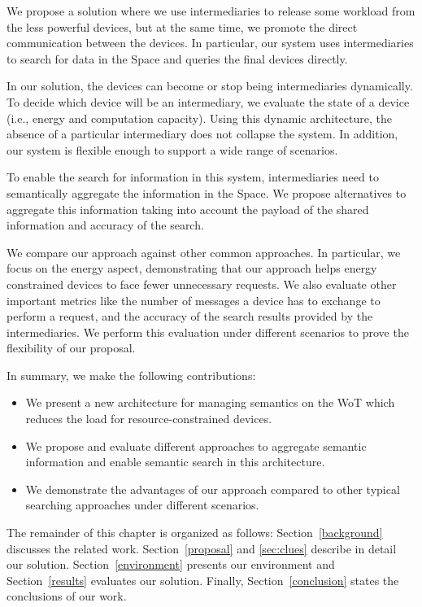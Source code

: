 We propose a solution where we use intermediaries to release some workload from the less powerful devices, but at the same time, we promote the direct communication between the devices.
In particular, our system uses intermediaries to search for data in the Space and queries the final devices directly.

In our solution, the devices can become or stop being intermediaries dynamically.
To decide which device will be an intermediary, we evaluate the state of a device (i.e., energy and computation capacity).
Using this dynamic architecture, the absence of a particular intermediary does not collapse the system.
In addition, our system is flexible enough to support a wide range of scenarios.

To enable the search for information in this system, intermediaries need to semantically aggregate the information in the Space.
We propose alternatives to aggregate this information taking into account the payload of the shared information and accuracy of the search.

We compare our approach against other common approaches.
In particular, we focus on the energy aspect, demonstrating that our approach helps energy constrained devices to face fewer unnecessary requests.
We also evaluate other important metrics like the number of messages a device has to exchange to perform a request, and the accuracy of the search results provided by the intermediaries.
We perform this evaluation under different scenarios to prove the flexibility of our proposal.

In summary, we make the following contributions:
\begin{itemize}
\item We present a new architecture for managing semantics on the WoT which reduces the load for resource-constrained devices.
\item We propose and evaluate different approaches to aggregate semantic information and enable semantic search in this architecture.
\item We demonstrate the advantages of our approach compared to other typical searching approaches under different scenarios.
\end{itemize}

The remainder of this chapter is organized as follows:
Section~\ref{background} discusses the related work.
Section~\ref{proposal} and \ref{sec:clues} describe in detail our solution.
Section~\ref{environment} presents our environment and Section~\ref{results} evaluates our solution.
Finally, Section~\ref{conclusion} states the conclusions of our work.